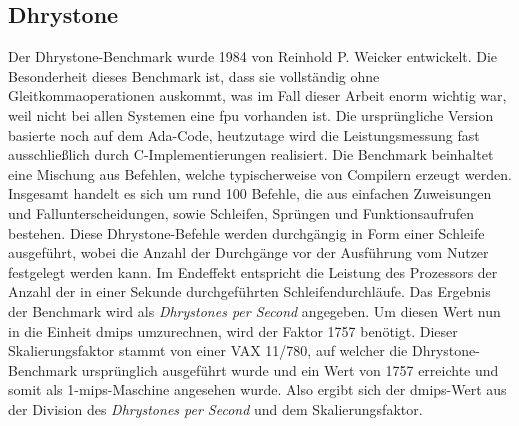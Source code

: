 \subsection{Dhrystone}\label{kap:dhrystone}
Der Dhrystone-Benchmark wurde 1984 von Reinhold P. Weicker entwickelt. Die Besonderheit dieses Benchmark ist, dass sie vollständig
ohne Gleitkommaoperationen auskommt, was im Fall dieser Arbeit enorm wichtig war, weil nicht bei allen Systemen eine \ac{fpu} vorhanden ist.
Die ursprüngliche Version basierte noch auf dem Ada-Code, heutzutage wird die Leistungsmessung fast ausschließlich durch C-Implementierungen
 realisiert. Die Benchmark beinhaltet eine Mischung aus Befehlen, welche typischerweise von Compilern erzeugt werden. Insgesamt handelt es sich
 um rund 100 Befehle, die aus einfachen Zuweisungen und Fallunterscheidungen, sowie Schleifen, Sprüngen und Funktionsaufrufen bestehen.
  Diese Dhrystone-Befehle werden durchgängig in Form einer Schleife ausgeführt, wobei die Anzahl der Durchgänge vor der Ausführung vom
  Nutzer festgelegt werden kann. Im Endeffekt entspricht die Leistung des Prozessors der Anzahl der in einer Sekunde durchgeführten Schleifendurchläufe.
  Das Ergebnis der Benchmark wird als \emph{Dhrystones per Second} angegeben. Um diesen Wert nun in die Einheit \ac{dmips} umzurechnen, wird der Faktor 1757 benötigt. Dieser Skalierungsfaktor
  stammt von einer VAX 11/780, auf welcher die Dhrystone-Benchmark ursprünglich ausgeführt wurde und ein Wert von 1757 erreichte und somit als 1-\ac{mips}-Maschine angesehen wurde. Also ergibt sich der
  \ac{dmips}-Wert aus der Division des \emph{Dhrystones per Second} und dem Skalierungsfaktor.~\cite{benchmark}

